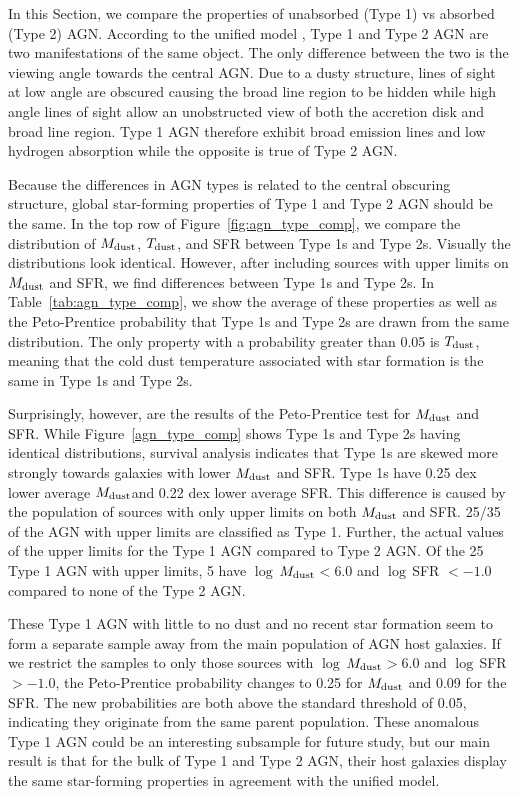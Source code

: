 \documentclass[fleqn, usenatbib]{mnras}
\newcommand{\mdust}{$M_{\rm dust}$}
\newcommand{\tdust}{$T_{\rm dust}$}
\begin{document}
In this Section, we compare the properties of unabsorbed (Type 1) vs absorbed (Type 2) AGN. According to the unified model \citep{Antonucci:1993os,Urry:1995il}, Type 1 and Type 2 AGN are two manifestations of the same object. The only difference between the two is the viewing angle towards the central AGN. Due to a dusty structure, lines of sight at low angle are obscured causing the broad line region to be hidden while high angle lines of sight allow an unobstructed view of both the accretion disk and broad line region. Type 1 AGN therefore exhibit broad emission lines and low hydrogen absorption while the opposite is true of Type 2 AGN. 

Because the differences in AGN types is related to the central obscuring structure, global star-forming properties of Type 1 and Type 2 AGN should be the same. In the top row of Figure~\ref{fig:agn_type_comp}, we compare the distribution of \mdust, \tdust, and SFR between Type 1s and Type 2s. Visually the distributions look identical. However, after including sources with upper limits on \mdust{} and SFR, we find differences between Type 1s and Type 2s. In Table~\ref{tab:agn_type_comp}, we show the average of these properties as well as the Peto-Prentice probability that Type 1s and Type 2s are drawn from the same distribution. The only property with a probability greater than 0.05 is \tdust, meaning that the cold dust temperature associated with star formation is the same in Type 1s and Type 2s. 

Surprisingly, however, are the results of the Peto-Prentice test for \mdust{} and SFR. While Figure~\ref{agn_type_comp} shows Type 1s and Type 2s having identical distributions, survival analysis indicates that Type 1s are skewed more strongly towards galaxies with lower \mdust{} and SFR. Type 1s have 0.25 dex lower average \mdust and 0.22 dex lower average SFR. This difference is caused by the population of sources with only upper limits on both \mdust{} and SFR. 25/35 of the AGN with upper limits are classified as Type 1. Further, the actual values of the upper limits for the Type 1 AGN compared to Type 2 AGN. Of the 25 Type 1 AGN with upper limits, 5 have $\log\,$\mdust $< 6.0$ and $\log\,$SFR $<-1.0$ compared to none of the Type 2 AGN. 

These Type 1 AGN with little to no dust and no recent star formation seem to form a separate sample away from the main population of AGN host galaxies. If we restrict the samples to only those sources with $\log\,$\mdust $> 6.0$ and $\log\,$SFR $>-1.0$, the Peto-Prentice probability changes to 0.25 for \mdust{} and 0.09 for the SFR. The new probabilities are both above the standard threshold of 0.05, indicating they originate from the same parent population. These anomalous Type 1 AGN could be an interesting subsample for future study, but our main result is that for the bulk of Type 1 and Type 2 AGN, their host galaxies display the same star-forming properties in agreement with the unified model.
\end{document}

